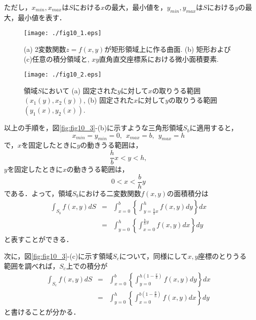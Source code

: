 \documentclass[10pt,a4j]{jarticle}
\begin{document}
ただし，$x_{min},x_{max}$は$S$における$x$の最大，最小値を，$y_{min},y_{max}$は$S$における$y$の最大，最小値を表す．
\begin{figure}[h]
	\begin{center}
	\texttt{[image: ./fig10\_1.eps]} 
	\end{center}
	\caption{
		(a) 2変数関数$z=f(x,y)$が矩形領域上に作る曲面. 
		(b) 矩形および(c)任意の積分領域と, $xy$直角直交座標系における微小面積要素. 
	} 
	\label{fig:fig10_1}
\end{figure}
\begin{figure}[h]
	\begin{center}
	\texttt{[image: ./fig10\_2.eps]} 
	\end{center}
	\caption{
		領域$S$において
		(a) 固定された$y$に対して$x$の取りうる範囲$\left(x_1(y),x_2(y)\right)$, 
		(b) 固定された$x$に対して$y$の取りうる範囲$\left(y_1(x),y_2(x)\right)$. 
	} 
	\label{fig:fig10_2}
\end{figure}
以上の手順を，図\ref{fig:fig10_3}-(b)に示すような三角形領域$S_b$に適用すると，
\begin{equation}
	x_{min}=y_{min}=0, \ \ x_{max}=b, \ \ y_{max}=h
\end{equation}
で，$x$を固定したときに$y$の動きうる範囲は，
\begin{equation}
	\frac{h}{b}x < y < h, 
	\label{eqn:ybnd_Sb}
\end{equation}
$y$を固定したときに$x$の動きうる範囲は，
\begin{equation}
	0 < x < \frac{b}{h}y
	\label{eqn:xbnd_Sb}
\end{equation}
である．よって，領域$S_b$における二変数関数$f(x,y)$の面積積分は
\begin{eqnarray}
	\int_{S_b} f(x,y) dS
	&=&
	\int_{x=0}^b \left\{ \int_{y=\frac{h}{b}x}^h f(x,y)dy\right\} dx 
	\label{eqn:int_Sb_yx}
	\\
	&=&
	\int_{y=0}^h \left\{ \int_{x=0}^{\frac{b}{h}y} f(x,y)dx\right\}dy
	\label{eqn:int_Sb_xy}
\end{eqnarray}
と表すことができる．

次に，図\ref{fig:fig10_3}-(c)に示す領域$S_c$について，同様にして$x,y$座標のとりうる範囲を調べれば，$S_c$上での積分が
\begin{eqnarray}
	\int_{S_c} f(x,y) dS
	&=&
	\int_{x=0}^b \left\{ \int_{y=0}^{h\left(1-\frac{x}{b}\right)} f(x,y)dy\right\}dx 
	\label{eqn:int_Sc_yx}
	\\
	&=&
	\int_{y=0}^h \left\{ \int_{x=0}^{b\left(1-\frac{y}{h}\right)} f(x,y)dx\right\} dy
	\label{eqn:int_Sc_xy}
\end{eqnarray}
と書けることが分かる．
\end{document}
